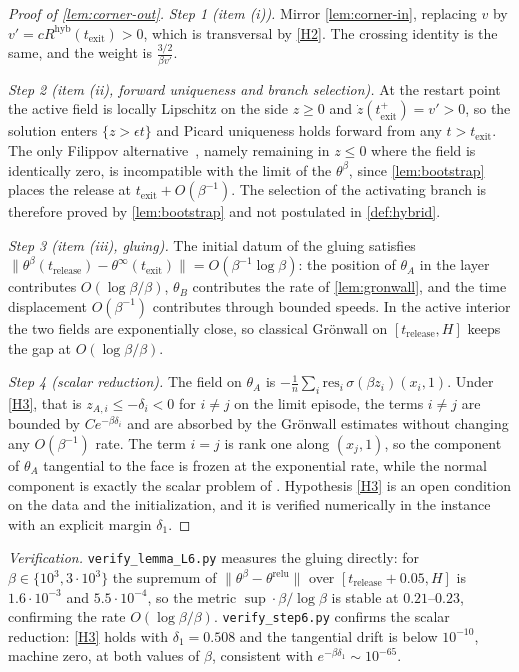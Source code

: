 \documentclass[11pt]{article}
\theoremstyle{definition}
\theoremstyle{remark}
\newcommand{\texit}{t_{\mathrm{exit}}}
\newcommand{\trel}{t_{\mathrm{release}}}
\newcommand{\hyb}{\mathrm{hyb}}
\begin{document}
\begin{proof}[Proof of \cref{lem:corner-out}]
\emph{Step 1 (item (i)).} Mirror \cref{lem:corner-in}, replacing $v$ by
$v'=cR^{\hyb}(\texit)>0$, which is transversal by \eqref{H2}. The crossing
identity is the same, and the weight is $\tfrac{3/2}{\beta v'}$.

\emph{Step 2 (item (ii), forward uniqueness and branch selection).} At the
restart point the active field is locally Lipschitz on the side $z\ge0$ and
$\dot z(\texit^+)=v'>0$, so the solution enters $\{z>\epsilon t\}$ and Picard
uniqueness holds forward from any $t>\texit$. The only Filippov
alternative~\cite{Fil88}, namely remaining in $z\le0$ where the field is
identically zero, is incompatible with the limit of the $\theta^\beta$, since
\cref{lem:bootstrap} places the release at $\texit+O(\beta^{-1})$. The selection
of the activating branch is therefore proved by \cref{lem:bootstrap} and not
postulated in \cref{def:hybrid}.

\emph{Step 3 (item (iii), gluing).} The initial datum of the gluing satisfies
$\|\theta^\beta(\trel)-\theta^\infty(\texit)\|=O(\beta^{-1}\log\beta)$: the
position of $\theta_A$ in the layer contributes $O(\log\beta/\beta)$, $\theta_B$
contributes the rate of \cref{lem:gronwall}, and the time displacement
$O(\beta^{-1})$ contributes through bounded speeds. In the active interior the
two fields are exponentially close, so classical Gr\"onwall on $[\trel,H]$ keeps
the gap at $O(\log\beta/\beta)$.

\emph{Step 4 (scalar reduction).} The field on $\theta_A$ is
$-\tfrac1n\sum_i\mathrm{res}_i\,\sigma(\beta z_i)(x_i,1)$. Under \eqref{H3}, that
is $z_{A,i}\le-\delta_i<0$ for $i\ne j$ on the limit episode, the terms $i\ne j$
are bounded by $Ce^{-\beta\delta_i}$ and are absorbed by the Gr\"onwall estimates
without changing any $O(\beta^{-1})$ rate. The term $i=j$ is rank one along
$(x_j,1)$, so the component of $\theta_A$ tangential to the face is frozen at the
exponential rate, while the normal component is exactly the scalar problem of
. Hypothesis \eqref{H3} is an open condition
on the data and the initialization, and it is verified numerically in the
instance with an explicit margin $\delta_1$.
\end{proof}

\noindent\emph{Verification.} \texttt{verify\_lemma\_L6.py} measures the
gluing directly: for $\beta\in\{10^3,3\cdot10^3\}$ the supremum of
$\|\theta^\beta-\theta^{\mathrm{relu}}\|$ over $[\trel+0.05,H]$ is
$1.6\cdot10^{-3}$ and $5.5\cdot10^{-4}$, so the metric $\sup\cdot\beta/\log\beta$
is stable at $0.21$--$0.23$, confirming the rate $O(\log\beta/\beta)$.
\texttt{verify\_step6.py} confirms the scalar reduction: \eqref{H3} holds
with $\delta_1=0.508$ and the tangential drift is below $10^{-10}$, machine zero,
at both values of $\beta$, consistent with $e^{-\beta\delta_1}\sim10^{-65}$.
\end{document}
